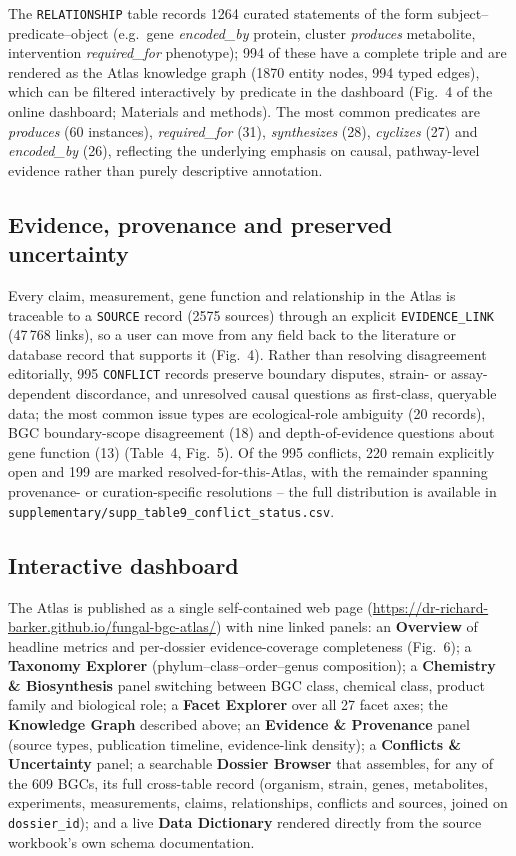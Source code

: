 The \texttt{RELATIONSHIP} table records 1264 curated statements of the form
subject--predicate--object (e.g.\ gene \emph{encoded\_by} protein, cluster \emph{produces}
metabolite, intervention \emph{required\_for} phenotype); 994 of these have a complete triple and
are rendered as the Atlas knowledge graph (1870 entity nodes, 994 typed edges), which can be
filtered interactively by predicate in the dashboard (Fig.~4 of the online dashboard; Materials and
methods). The most common predicates are \emph{produces} (60 instances), \emph{required\_for} (31),
\emph{synthesizes} (28), \emph{cyclizes} (27) and \emph{encoded\_by} (26), reflecting the underlying
emphasis on causal, pathway-level evidence rather than purely descriptive annotation.

\subsection{Evidence, provenance and preserved uncertainty}

Every claim, measurement, gene function and relationship in the Atlas is traceable to a
\texttt{SOURCE} record (2575 sources) through an explicit \texttt{EVIDENCE\_LINK} (47\,768 links),
so a user can move from any field back to the literature or database record that supports it
(Fig.~4). Rather than resolving disagreement editorially, 995 \texttt{CONFLICT} records preserve
boundary disputes, strain- or assay-dependent discordance, and unresolved causal questions as
first-class, queryable data; the most common issue types are ecological-role ambiguity (20 records),
BGC boundary-scope disagreement (18) and depth-of-evidence questions about gene function (13)
(Table~4, Fig.~5). Of the 995 conflicts, 220 remain explicitly open and 199 are marked
resolved-for-this-Atlas, with the remainder spanning provenance- or curation-specific resolutions --
the full distribution is available in \texttt{supplementary/supp\_table9\_conflict\_status.csv}.

\subsection{Interactive dashboard}

The Atlas is published as a single self-contained web page
(\url{https://dr-richard-barker.github.io/fungal-bgc-atlas/}) with nine linked panels: an
\textbf{Overview} of headline metrics and per-dossier evidence-coverage completeness (Fig.~6); a
\textbf{Taxonomy Explorer} (phylum--class--order--genus composition); a \textbf{Chemistry \&
Biosynthesis} panel switching between BGC class, chemical class, product family and biological role;
a \textbf{Facet Explorer} over all 27 facet axes; the \textbf{Knowledge Graph} described above; an
\textbf{Evidence \& Provenance} panel (source types, publication timeline, evidence-link density); a
\textbf{Conflicts \& Uncertainty} panel; a searchable \textbf{Dossier Browser} that assembles, for any
of the 609 BGCs, its full cross-table record (organism, strain, genes, metabolites, experiments,
measurements, claims, relationships, conflicts and sources, joined on \texttt{dossier\_id}); and a
live \textbf{Data Dictionary} rendered directly from the source workbook's own schema documentation.
